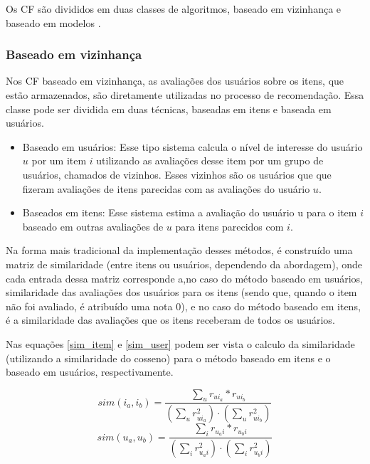 Os CF são divididos em duas classes de algoritmos, baseado em vizinhança e baseado em modelos \cite{koren2015advances}.

\subsubsection{Baseado em vizinhança}
Nos CF baseado em vizinhança, as avaliações dos  usuários sobre os itens, que estão armazenados, são diretamente utilizadas no processo de recomendação. Essa classe pode ser dividida em duas técnicas, baseadas em itens e baseada em usuários. 
\begin{itemize}
    \item Baseado em  usuários: Esse tipo sistema calcula o nível de interesse do usuário \(u\) por um item \(i\) utilizando as avaliações desse item por um grupo de usuários, chamados de vizinhos. Esses vizinhos são os usuários que que fizeram avaliações de itens parecidas com as  avaliações do usuário \(u\).
    \item Baseados em itens: Esse sistema estima a avaliação do usuário u para o item \(i\) baseado em outras avaliações de  \(u\) para itens parecidos com \(i\). 

\end{itemize}
Na forma mais tradicional da implementação desses métodos, é construído uma matriz de similaridade (entre itens ou usuários, dependendo da abordagem), onde cada entrada dessa matriz corresponde a,no caso do método baseado em usuários, similaridade das avaliações dos usuários para os itens (sendo  que, quando o item não foi avaliado, é atribuído uma nota 0), e no caso do método baseado em itens, é a similaridade das avaliações que os itens receberam de todos os usuários.

Nas equações \ref{sim_item} e \ref{sim_user} podem ser vista o calculo da similaridade (utilizando a similaridade do cosseno) para o método baseado em itens e o baseado em usuários, respectivamente.

\begin{equation}
\label{sim_item}
    sim(i_a, i_b) = \frac{\sum_{u} r_{ui_a} * r_{ui_b}}{(\sum_{u} r_{ui_a}^{2}) \cdot (\sum_{u} r_{ui_b}^{2}) }
\end{equation}
\begin{equation}
\label{sim_user}
    sim(u_a, u_b) = \frac{\sum_{i} r_{u_ai} * r_{u_bi}}{(\sum_{i} r_{u_ai}^{2}) \cdot (\sum_{i} r_{u_bi}^{2}) }
\end{equation}

